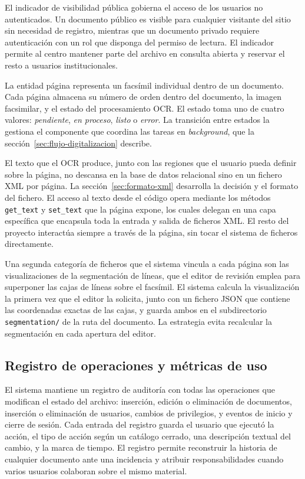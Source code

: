 El indicador de visibilidad pública gobierna el acceso de los usuarios no autenticados. Un documento público es visible para cualquier visitante del sitio sin necesidad de registro, mientras que un documento privado requiere autenticación con un rol que disponga del permiso de lectura. El indicador permite al centro mantener parte del archivo en consulta abierta y reservar el resto a usuarios institucionales.

La entidad página representa un facsímil individual dentro de un documento. Cada página almacena su número de orden dentro del documento, la imagen facsimilar, y el estado del procesamiento OCR. El estado toma uno de cuatro valores: \textit{pendiente}, \textit{en proceso}, \textit{listo} o \textit{error}. La transición entre estados la gestiona el componente que coordina las tareas en \textit{background}, que la sección~\ref{sec:flujo-digitalizacion} describe.

El texto que el OCR produce, junto con las regiones que el usuario pueda definir sobre la página, no descansa en la base de datos relacional sino en un fichero XML por página. La sección~\ref{sec:formato-xml} desarrolla la decisión y el formato del fichero. El acceso al texto desde el código opera mediante los métodos \texttt{get\_text} y \texttt{set\_text} que la página expone, los cuales delegan en una capa específica que encapsula toda la entrada y salida de ficheros XML. El resto del proyecto interactúa siempre a través de la página, sin tocar el sistema de ficheros directamente.

Una segunda categoría de ficheros que el sistema vincula a cada página son las visualizaciones de la segmentación de líneas, que el editor de revisión emplea para superponer las cajas de líneas sobre el facsímil. El sistema calcula la visualización la primera vez que el editor la solicita, junto con un fichero JSON que contiene las coordenadas exactas de las cajas, y guarda ambos en el subdirectorio \texttt{segmentation/} de la ruta del documento. La estrategia evita recalcular la segmentación en cada apertura del editor.

\subsection{Registro de operaciones y métricas de uso}
\label{subsec:auditoria}

El sistema mantiene un registro de auditoría con todas las operaciones que modifican el estado del archivo: inserción, edición o eliminación de documentos, inserción o eliminación de usuarios, cambios de privilegios, y eventos de inicio y cierre de sesión. Cada entrada del registro guarda el usuario que ejecutó la acción, el tipo de acción según un catálogo cerrado, una descripción textual del cambio, y la marca de tiempo. El registro permite reconstruir la historia de cualquier documento ante una incidencia y atribuir responsabilidades cuando varios usuarios colaboran sobre el mismo material.

